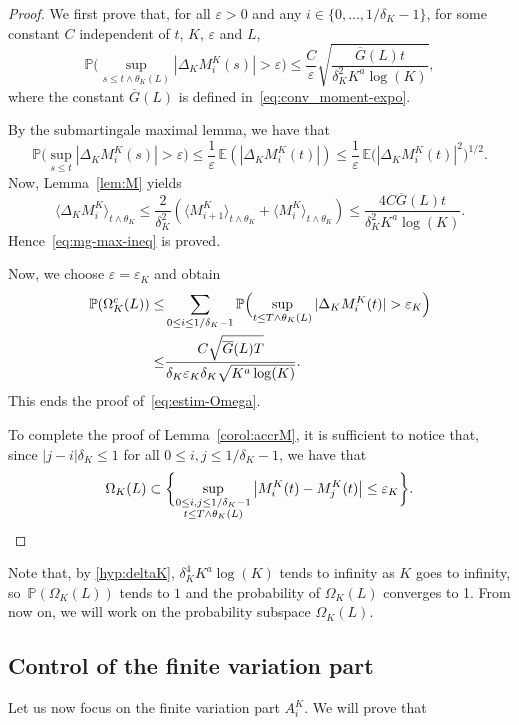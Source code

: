 \documentclass[10pt]{amsart}
\theoremstyle{plain}
\theoremstyle{remark}
\begin{document}
\begin{proof}
We first prove that, for all $\varepsilon>0$ and any $i\in\{0,\ldots,1/\delta_K-1\}$, for some constant $C$ independent of $t$, $K$, $\varepsilon$ and $L$,
\begin{equation}
\label{eq:mg-max-ineq}
\mathbb{P}\Big(\sup_{s\le t\wedge \theta_K(L) } |\Delta_KM^K_{i}(s)|>\varepsilon\Big)\leq \frac{C}{\varepsilon} \sqrt{ \frac{ \overline{G}(L) t}{\delta_K^2 K^{a}\log(K)} },
\end{equation}
where the constant $\overline{G}(L)$ is defined in~\eqref{eq:conv_moment-expo}.

By the submartingale maximal lemma, we have that \[ \mathbb{P}\Big(\sup_{s\le t} |\Delta_KM^K_{i}(s)|>\varepsilon\Big)\leq \frac1\varepsilon\,\mathbb{E}(|\Delta_KM^K_{i}(t)|) \leq \frac1\varepsilon\, \mathbb{E}\big(|\Delta_KM^K_{i}(t)|^2\big)^{1/2}.\]
Now, Lemma~\ref{lem:M} yields
\[
\langle\Delta_KM^K_{i} \rangle_{t\wedge \theta_K}
\leq \frac{2}{\delta_K^2}\left(\langle M^K_{i+1} \rangle_{t\wedge \theta_K} + \langle M^K_{i} \rangle_{t\wedge \theta_K}\right)
\leq \frac{ 4 C\overline{G}(L) t}{\delta_K^2 K^{a}\log(K)}.
\]
Hence~\eqref{eq:mg-max-ineq} is proved.

Now, we choose $\varepsilon=\varepsilon_K$ and obtain
\begin{align*}
\mathbb{P}(\Omega_K^c(L))\leq & \sum_{0\leq i\leq 1/\delta_K-1}\mathbb{P}\Bigl(\sup_{t\le T\wedge \theta_K(L)} |\Delta_KM^K_{i}(t)| > \varepsilon_{K}
\Bigr)\\
\leq & \frac{C\sqrt{\overline{G}(L)T}}{\delta_K\varepsilon_K \delta_K \sqrt{K^{a}\log(K)}}.
\end{align*}
This ends the proof of~\eqref{eq:estim-Omega}.

To complete the proof of
Lemma~\ref{corol:accrM}, it is sufficient to notice that, since $|j-i|\delta_K \le 1$ for all $0\leq i,j\leq 1/\delta_K-1$, we have that
\[
\Omega_K(L)\subset\biggl\{\sup_{\substack{0\leq i,j\leq 1/\delta_K-1\\ t\le T\wedge \theta_K(L)}}\left|M^K_i(t)-M^K_j(t)\right|\leq\varepsilon_K\biggr\}. \qedhere
\]
\end{proof}

Note that, by \eqref{hyp:deltaK}, $\delta_K^4 K^{a}\log(K)$ tends to infinity as $K$ goes to infinity, so~$ \mathbb{P}(\Omega_{K}(L))$ tends to $1$ and the probability of $\Omega_{K}(L)$ converges to 1.
From now on, we will work on the probability subspace $\Omega_{K}(L)$.

\subsection{Control of the finite variation part}\label{sec:control-fv}
Let us now focus on the finite variation part $A^K_i$. We will prove that
\end{document}
